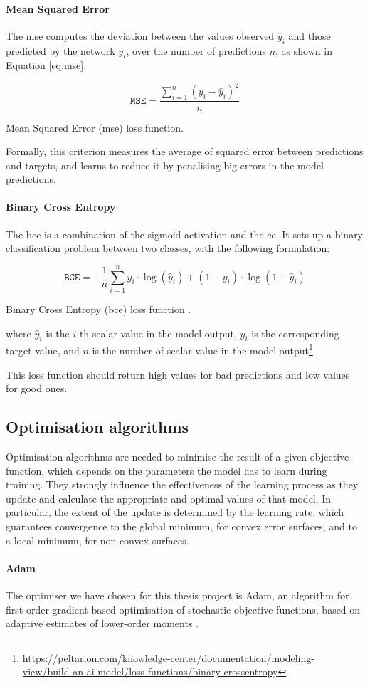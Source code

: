 \paragraph*{Mean Squared Error} 
The \gls{mse} computes the deviation between the values observed $\hat y_i$ and 
those predicted by the network $y_i$, over the number of predictions $n$, as 
shown in Equation \ref{eq:mse}.
\begin{Equation}[!htb]
	\centering
	\begin{equation}
	\mathtt{MSE} = \frac{\sum_{i=1}^n (y_i-\hat y_i)^2}{n}
	\end{equation}
	\caption{Mean Squared Error (\gls{mse}) loss function.}
	\label{eq:mse}
\end{Equation}
Formally, this criterion measures the average of squared error between 
predictions and targets, and learns to reduce it by penalising big errors in the 
model predictions.

\paragraph*{Binary Cross Entropy} 
The \gls{bce} is a combination of the sigmoid activation and the \gls{ce}. It sets up 
a binary classification problem between two classes, with the following 
formulation:

\begin{Equation}[!htb]
	\centering
	\begin{equation}
	\mathtt{BCE} = -\frac{1}{n} \sum_{i=1}^n y_i \cdot \log(\hat y_i) + (1-y_i) 
	\cdot \log(1 - \hat y_i)
	\end{equation}
	\caption[Binary Cross Entropy (\gls{bce}) loss function.\bigskip]{Binary Cross 
	Entropy 
	(\gls{bce}) loss function \cite[][]{sadowski2016notes}.}
	\label{eq:bce}
\end{Equation}

\noindent
where $\hat y_i$ is the $i$-th scalar value in the model output, $y_i$ is the 
corresponding target value, and $n$ is the number of scalar value in the model 
output\footnote{\url{https://peltarion.com/knowledge-center/documentation/modeling-view/build-an-ai-model/loss-functions/binary-crossentropy}}.
 
This loss function should return high values for bad predictions and low values for 
good ones.

\subsection{Optimisation algorithms}
\label{subsec:optimiser}
Optimisation algorithms are needed to minimise the result of a given objective 
function, which depends on the parameters the model has to learn during 
training.
They strongly influence the effectiveness of the learning process as they update 
and calculate the appropriate and optimal values of that model. 
In particular, the extent of the update is determined by the learning rate, which 
guarantees convergence to the global minimum, for convex error surfaces, and to 
a local minimum, for non-convex surfaces.

\paragraph*{Adam}

The optimiser we have chosen for this thesis project is Adam, {an algorithm for 
first-order gradient-based optimisation of stochastic objective functions, based 
on adaptive estimates of lower-order moments} \cite[see][]{kingma2014adam, 
loshchilov2017decoupled}. 
